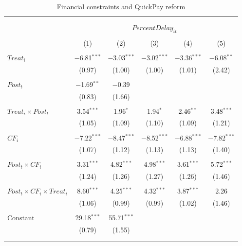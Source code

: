 \documentclass[
]{article}
\begin{document}
\begin{table}[H] \centering 
  \caption{Financial constraints and QuickPay reform} 
  \label{} 
\small 
\begin{tabular}{@{\extracolsep{-2pt}}lccccc} 
\\[-1.8ex]\hline 
\hline \\[-1.8ex] 
\\[-1.8ex] & \multicolumn{5}{c}{$PercentDelay_{it}$  } \\ 
\\[-1.8ex] & (1) & (2) & (3) & (4) & (5)\\ 
\hline \\[-1.8ex] 
 $Treat_i$ & $-$6.81$^{***}$ & $-$3.03$^{***}$ & $-$3.02$^{***}$ & $-$3.36$^{***}$ & $-$6.08$^{**}$ \\ 
  & (0.97) & (1.00) & (1.00) & (1.01) & (2.42) \\ 
  & & & & & \\ 
 $Post_t$ & $-$1.69$^{**}$ & $-$0.39 &  &  &  \\ 
  & (0.83) & (1.66) &  &  &  \\ 
  & & & & & \\ 
 $Treat_i \times Post_t$ & 3.54$^{***}$ & 1.96$^{*}$ & 1.94$^{*}$ & 2.46$^{**}$ & 3.48$^{***}$ \\ 
  & (1.05) & (1.09) & (1.10) & (1.09) & (1.21) \\ 
  & & & & & \\ 
 $CF_i$ & $-$7.22$^{***}$ & $-$8.47$^{***}$ & $-$8.52$^{***}$ & $-$6.88$^{***}$ & $-$7.82$^{***}$ \\ 
  & (1.07) & (1.12) & (1.13) & (1.13) & (1.40) \\ 
  & & & & & \\ 
 $Post_t \times CF_i$ & 3.31$^{***}$ & 4.82$^{***}$ & 4.98$^{***}$ & 3.61$^{***}$ & 5.72$^{***}$ \\ 
  & (1.24) & (1.26) & (1.27) & (1.26) & (1.46) \\ 
  & & & & & \\ 
 $Post_t \times CF_i \times Treat_i$ & 8.60$^{***}$ & 4.25$^{***}$ & 4.32$^{***}$ & 3.87$^{***}$ & 2.26 \\ 
  & (1.06) & (0.99) & (0.99) & (1.02) & (1.46) \\ 
  & & & & & \\ 
 Constant & 29.18$^{***}$ & 55.71$^{***}$ &  &  &  \\ 
  & (0.79) & (1.55) &  &  &  \\ 
  & & & & & \\ 
\hline \\[-1.8ex] 

\end{tabular}
\end{table}
\end{document}

